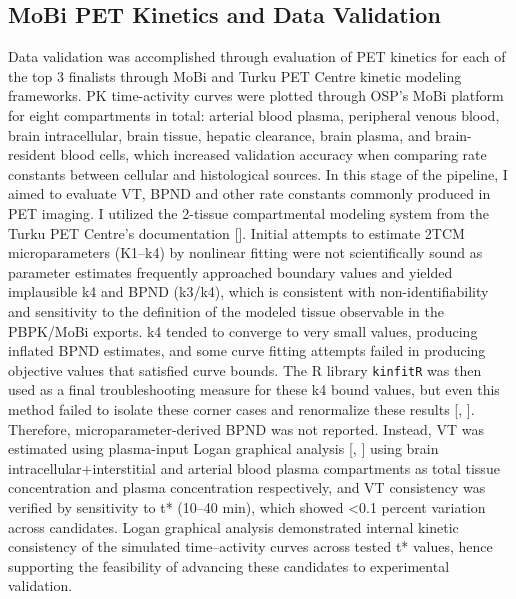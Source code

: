 \documentclass[times, twoside]{zHenriquesLab-StyleBioRxiv}
\begin{document}
		\subsection{MoBi PET Kinetics and Data Validation}
		Data validation was accomplished through evaluation of PET kinetics for each of the top 3 finalists through MoBi and Turku PET Centre kinetic modeling frameworks. PK time-activity curves were plotted through OSP’s MoBi platform for eight compartments in total: arterial blood plasma, peripheral venous blood, brain intracellular, brain tissue, hepatic clearance, brain plasma, and brain-resident blood cells, which increased validation accuracy when comparing rate constants between cellular and histological sources. In this stage of the pipeline, I aimed to evaluate VT, BPND and other rate constants commonly produced in PET imaging. I utilized the 2-tissue compartmental modeling system from the Turku PET Centre’s documentation [\cite{centre2018, vainio2022, buchert2003, hong2010, koeppe1985}]. Initial attempts to estimate 2TCM microparameters (K1–k4) by nonlinear fitting were not scientifically sound as parameter estimates frequently approached boundary values and yielded implausible k4 and BPND (k3/k4), which is consistent with non-identifiability and sensitivity to the definition of the modeled tissue observable in the PBPK/MoBi exports. k4 tended to converge to very small values, producing inflated BPND estimates, and some curve fitting attempts failed in producing objective values that satisfied curve bounds. The R library \texttt{kinfitR} was then used as a final troubleshooting measure for these k4 bound values, but even this method failed to isolate these corner cases and renormalize these results [\cite{tjerkaski2020}, \cite{matheson2019}]. Therefore, microparameter-derived BPND was not reported. Instead, VT was estimated using plasma-input Logan graphical analysis [\cite{centren.d}, \cite{centre2016}] using brain intracellular+interstitial and arterial blood plasma compartments as total tissue concentration and plasma concentration respectively, and VT consistency was verified by sensitivity to t* (10–40 min), which showed <0.1 percent variation across candidates. Logan graphical analysis demonstrated internal kinetic consistency of the simulated time–activity curves across tested t* values, hence supporting the feasibility of advancing these candidates to experimental validation.
		
\end{document}
